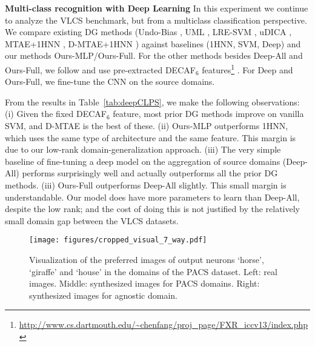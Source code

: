 \documentclass[10pt,twocolumn,letterpaper]{article}
\begin{document}
\vspace{0.2cm}\noindent\textbf{Multi-class recognition with Deep Learning}\quad
In this experiment we continue to analyze the VLCS benchmark, but from a multiclass classification perspective. We compare existing DG methods (Undo-Bias \cite{ECCV12_Khosla}, UML \cite{fang2013unbiased}, LRE-SVM \cite{xu2014exploiting}, uDICA \cite{muandet2013domainGen}, MTAE+1HNN \cite{ghifary2015domain}, D-MTAE+1HNN \cite{ghifary2015domain}) against baselines (1HNN, SVM, Deep) and our methods Ours-MLP/Ours-Full. For the other methods besides Deep-All and Ours-Full, we follow \cite{ghifary2015domain} and use pre-extracted DECAF$_6$ features\footnote{\url{http://www.cs.dartmouth.edu/~chenfang/proj_page/FXR_iccv13/index.php}} \cite{donahue2014decaf}. For Deep and Ours-Full, we fine-tune the CNN on the source domains.

From the results in Table~\ref{tab:deepCLPS}, we make the following observations: (i) Given the fixed DECAF$_6$ feature, most prior DG methods improve on vanilla SVM, and D-MTAE \cite{ghifary2015domain} is the best of these. (ii) Ours-MLP outperforms 1HNN, which uses the same type of architecture 
and the same feature. This margin is due to our low-rank domain-generalization approach. (iii) The very simple baseline of fine-tuning a deep model on the aggregation of source domains (Deep-All) performs surprisingly well and actually outperforms all the prior DG methods. (iii) Ours-Full outperforms Deep-All slightly. This small margin is understandable. Our model does have more parameters to learn than Deep-All, despite the low rank; and the cost of doing this is not justified by the relatively small domain gap between the VLCS datasets.
 


\begin{figure*}[!t]
\centering
\texttt{[image: figures/cropped\_visual\_7\_way.pdf]}
\caption{Visualization of the preferred images of output neurons `horse', `giraffe' and `house' in the domains of the PACS dataset. Left: real images. Middle: synthesized images for PACS domains. Right: synthesized images for agnostic domain.}
\label{fig:visualization4domain}
\end{figure*}
\end{document}
